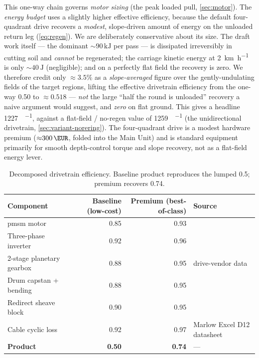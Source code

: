 \documentclass[11pt,a4paper]{article}
\begin{document}
This one-way chain governs \emph{motor sizing} (the peak loaded pull, \cref{sec:motor}). The \emph{energy budget} uses a slightly higher effective efficiency, because the default four-quadrant drive recovers a \emph{modest}, slope-driven amount of energy on the unloaded return leg (\cref{eq:regen}). We are deliberately conservative about its size. The draft work itself --- the dominant ${\sim}90\,\si{\kilo\joule}$ per pass --- is dissipated irreversibly in cutting soil and \emph{cannot} be regenerated; the carriage kinetic energy at \SI{2}{\kilo\meter\per\hour} is only ${\sim}\SI{40}{\joule}$ (negligible); and on a perfectly flat field the recovery is zero. We therefore credit only ${\approx}3.5\%$ as a \emph{slope-averaged} figure over the gently-undulating fields of the target regions, lifting the effective drivetrain efficiency from the one-way 0.50 to ${\approx}0.518$ --- \emph{not} the large ``half the round is unloaded'' recovery a naive argument would suggest, and \emph{zero} on flat ground. This gives a headline \SI{1227}{\Wh\per\decare}, against a flat-field / no-regen value of \SI{1259}{\Wh\per\decare} (the unidirectional drivetrain, \cref{sec:variant-norering}). The four-quadrant drive is a modest hardware premium (${\approx}\SI{300}{\EUR}$, folded into the Main Unit) and is standard equipment primarily for smooth depth-control torque and slope recovery, not as a flat-field energy lever.

\begin{table}[H]
\centering\small
\caption{Decomposed drivetrain efficiency. Baseline product reproduces the lumped 0.5; premium recovers 0.74.}\label{tab:eta-decomposition}
\begin{tabularx}{\textwidth}{Xrrl}
\toprule
Component & Baseline (low-cost) & Premium (best-of-class) & Source \\
\midrule
\gls{pmsm} motor              & 0.85 & 0.93 & \cite{asabe-ep496} \\
Three-phase inverter           & 0.92 & 0.96 & \cite{asabe-ep496} \\
2-stage planetary gearbox      & 0.88 & 0.95 & drive-vendor data \\
Drum capstan + bending         & 0.88 & 0.95 & \cite{feyrer2015wireropes} \\
Redirect sheave block          & 0.90 & 0.95 & \cite{feyrer2015wireropes} \\
Cable cyclic loss              & 0.92 & 0.97 & Marlow Excel D12 datasheet \\
\midrule
\textbf{Product}               & \textbf{0.50} & \textbf{0.74} & --- \\
\bottomrule
\end{tabularx}
\end{table}
\end{document}
